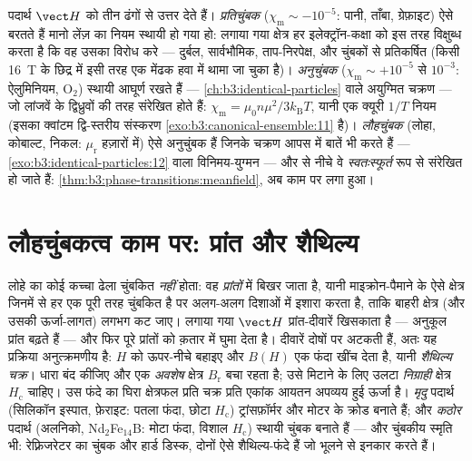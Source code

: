 \begin{remark}[तीन चुंबकीय स्वभाव]\label{rem:b3:electromagnetism-in-matter:zoo}
पदार्थ $\vect H$ को तीन ढंगों से उत्तर देते हैं।
\emph{प्रतिचुंबक} ($\chi_{\text{m}} \sim -10^{-5}$: पानी, ताँबा,
ग्रेफ़ाइट) ऐसे बरतते हैं मानो लेंज़ का नियम स्थायी हो गया हो: लगाया
गया क्षेत्र हर इलेक्ट्रॉन-कक्षा को इस तरह विक्षुब्ध करता है कि वह
उसका विरोध करे --- दुर्बल, सार्वभौमिक, ताप-निरपेक्ष, और चुंबकों से
प्रतिकर्षित (किसी \qty{16}{T} के छिद्र में इसी तरह एक मेंढक हवा में
थामा जा चुका है)।
\emph{अनुचुंबक} ($\chi_{\text{m}} \sim +10^{-5}$ से $10^{-3}$:
ऐलुमिनियम, O$_2$) स्थायी आघूर्ण रखते हैं ---
\cref{ch:b3:identical-particles} वाले अयुग्मित चक्रण --- जो लांजवें
के द्विध्रुवों की तरह संरेखित होते हैं:
$\chi_{\text{m}} = \mu_0 n\mu^2/3k_{\text{B}}T$, यानी एक क्यूरी
$1/T$ नियम (इसका क्वांटम द्वि-स्तरीय संस्करण
\cref{exo:b3:canonical-ensemble:11} है)।
\emph{लौहचुंबक} (लोहा, कोबाल्ट, निकल: $\mu_{\text{r}}$ हज़ारों में)
ऐसे अनुचुंबक हैं जिनके चक्रण आपस में बातें भी करते हैं ---
\cref{exo:b3:identical-particles:12} वाला विनिमय-युग्मन ---
और  से नीचे वे \emph{स्वतःस्फूर्त} रूप से संरेखित हो जाते
हैं: \cref{thm:b3:phase-transitions:meanfield}, अब काम पर लगा हुआ।
\end{remark}

\section{लौहचुंबकत्व काम पर: प्रांत और शैथिल्य}

\begin{definition}[प्रांत और शैथिल्य]\label{def:b3:electromagnetism-in-matter:hysteresis}
लोहे का कोई कच्चा ढेला चुंबकित \emph{नहीं} होता: वह
\emph{प्रांतों} में बिखर जाता है, यानी माइक्रोन-पैमाने के ऐसे क्षेत्र
जिनमें से हर एक पूरी तरह चुंबकित है पर अलग-अलग दिशाओं में इशारा करता
है, ताकि बाहरी क्षेत्र (और उसकी ऊर्जा-लागत) लगभग कट जाए। लगाया गया
$\vect H$ प्रांत-दीवारें खिसकाता है --- अनुकूल प्रांत बढ़ते हैं ---
और फिर पूरे प्रांतों को क़तार में घुमा देता है। दीवारें दोषों पर
अटकती हैं, अतः यह प्रक्रिया अनुत्क्रमणीय है: $H$ को ऊपर-नीचे बहाइए
और $B(H)$ एक फंदा खींच देता है, यानी \emph{शैथिल्य चक्र}। धारा बंद
कीजिए और एक \emph{अवशेष} क्षेत्र
$B_{\text{r}}$ बचा रहता है; उसे मिटाने के लिए उलटा
\emph{निग्राही} क्षेत्र $H_{\text{c}}$ चाहिए। उस फंदे का घिरा
क्षेत्रफल प्रति चक्र प्रति एकांक आयतन अपव्यय हुई ऊर्जा है।
\emph{मृदु} पदार्थ (सिलिकॉन इस्पात, फ़ेराइट: पतला फंदा, छोटा
$H_{\text{c}}$) ट्रांसफ़ॉर्मर और मोटर के क्रोड बनाते हैं; और
\emph{कठोर} पदार्थ (अलनिको, Nd$_2$Fe$_{14}$B: मोटा फंदा, विशाल
$H_{\text{c}}$) स्थायी चुंबक बनाते हैं --- और चुंबकीय स्मृति भी:
रेफ़्रिजरेटर का चुंबक और हार्ड डिस्क, दोनों ऐसे शैथिल्य-फंदे हैं जो
भूलने से इनकार करते हैं।
\end{definition}

